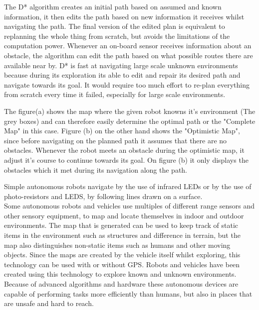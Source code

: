 The D* algorithm creates an initial path based on assumed and known information, it then edits the path based on new information it receives whilst navigating the path. The final version of the edited plan is equivalent to replanning the whole thing from scratch, but avoids the limitations of the computation power.
Whenever an on-board sensor receives information about an obstacle, the algorithm can edit the path based on what possible routes there are available near by.
D* is fast at navigating large scale unknown environments because during its exploration its able to edit and repair its desired path and navigate towards its goal. It would require too much effort to re-plan everything from scratch every time it failed, especially for large scale environments.\cite{dstar}\cite{moredstar}

The figure(a) shows the map where the given robot knowns it's environment (The grey boxes) and can therefore easily determine the optimal path or the "Complete Map" in this case. Figure (b) on the other hand shows the "Optimistic Map", since before navigating on the planned path it assumes that there are no obstacles. Whenever the robot meets an obstacle during the optimistic map, it adjust it's course to continue towards its goal. On figure (b) it only displays the obstacles which it met during its navigation along the path.




\clearpage
Simple autonomous robots navigate by the use of infrared LEDs or by the use of photo-resistors and LEDS, by following lines drawn on a surface.\\
Some autonomous robots and vehicles use multiples of different range sensors and other sensory equipment, to map and locate themselves in indoor and outdoor environments. The map that is generated can be used to keep track of static items in the environment such as structures and difference in terrain, but the map also distinguishes non-static items such as humans and other moving objects. Since the maps are created by the vehicle itself whilst exploring, this technology can be used with or without GPS\cite{rangesens}\cite{rangesensarc}.  Robots and vehicles have been created using this technology to explore known and unknown environments. Because of advanced algorithms and hardware these autonomous devices are capable of performing tasks more efficiently than humans, but also in places that are unsafe and hard to reach.

